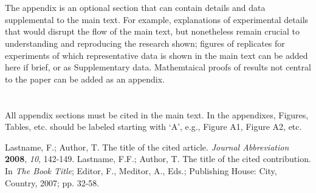 \documentclass[journal,article,submit,moreauthors,pdftex,10pt,a4paper]{mdpi}
\theoremstyle{mdpi}
\newcounter{ex}
\newcounter{re}
\theoremstyle{mdpidefinition}
\begin{document}

\appendix
\section{}
The appendix is an optional section that can contain details and data supplemental to the main text. For example, explanations of experimental details that would disrupt the flow of the main text, but nonetheless remain crucial to understanding and reproducing the research shown; figures of replicates for experiments of which representative data is shown in the main text can be added here if brief, or as Supplementary data. Mathemtaical proofs of results not central to the paper can be added as an appendix.

\section{}
All appendix sections must be cited in the main text. In the appendixes, Figures, Tables, etc. should be labeled starting with `A', e.g., Figure A1, Figure A2, etc. 



\renewcommand\bibname{References}
\begin{thebibliography}{999}
Lastname, F.; Author, T. The title of the cited article. {\em Journal Abbreviation} {\bf 2008}, {\em 10}, 142-149.
Lastname, F.F.; Author, T. The title of the cited contribution. In {\em The Book Title}; Editor, F., Meditor, A., Eds.; Publishing House: City, Country, 2007; pp. 32-58.
\end{thebibliography}

%


\end{document}
